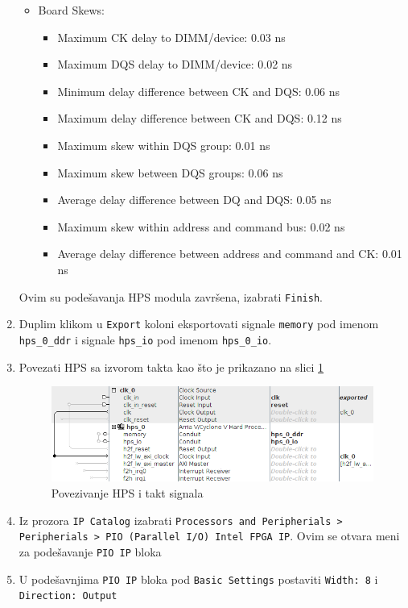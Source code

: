 \begin{enumerate}
{\begin{itemize}
\begin{itemize}
\item		Board Skews:
\begin{itemize}
\item			Maximum CK delay to DIMM/device: 0.03 ns
\item			Maximum DQS delay to DIMM/device: 0.02 ns
\item			Minimum delay difference between CK and DQS: 0.06 ns
\item			Maximum delay difference between CK and DQS: 0.12 ns
\item			Maximum skew within DQS group: 0.01 ns
\item			Maximum skew between DQS groups: 0.06 ns
\item			Average delay difference between DQ and DQS: 0.05 ns
\item			Maximum skew within address and command bus: 0.02 ns
\item			Average delay difference between address and command and CK: 0.01 ns
\end{itemize}
\end{itemize}
\end{itemize}
}
Ovim su podešavanja HPS modula završena, izabrati \texttt{Finish}.
\item  Duplim klikom u \texttt{Export} koloni eksportovati signale \texttt{memory} pod imenom \texttt{hps\_0\_ddr} i signale \texttt{hps\_io} pod imenom \texttt{hps\_0\_io}.
\item  Povezati HPS sa izvorom takta kao što je prikazano na slici \ref{slika:q1}
\begin{figure}[h!]
\centering
\includegraphics[scale=0.9]{img/quartus1.png}
\caption{Povezivanje HPS i takt signala}
\label{slika:q1}
\end{figure}
\item  Iz prozora \texttt{IP Catalog} izabrati \texttt{Processors and Peripherials > Peripherials > PIO (Parallel I/O) Intel FPGA IP}. Ovim se otvara meni za podešavanje \texttt{PIO IP} bloka
\item  U podešavnjima \texttt{PIO IP} bloka pod \texttt{Basic Settings} postaviti \texttt{Width: 8} i \texttt{Direction: Output}

\end{enumerate}
